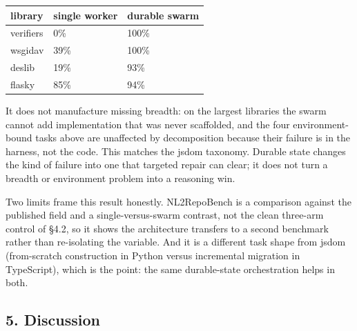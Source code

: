\documentclass[
  10pt,
]{article}
\newcounter{none} %
\begin{document}
{\def\LTcaptype{none} %
\begin{longtable}[]{@{}lll@{}}
\toprule\noalign{}
library & single worker & durable swarm \\
\midrule\noalign{}
\endhead
\bottomrule\noalign{}
\endlastfoot
verifiers & 0\% & 100\% \\
wsgidav & 39\% & 100\% \\
deslib & 19\% & 93\% \\
flasky & 85\% & 94\% \\
\end{longtable}
}

It does not manufacture missing breadth: on the largest libraries the
swarm cannot add implementation that was never scaffolded, and the four
environment-bound tasks above are unaffected by decomposition because
their failure is in the harness, not the code. This matches the jsdom
taxonomy. Durable state changes the kind of failure into one that
targeted repair can clear; it does not turn a breadth or environment
problem into a reasoning win.

Two limits frame this result honestly. NL2RepoBench is a comparison
against the published field and a single-versus-swarm contrast, not the
clean three-arm control of §4.2, so it shows the architecture transfers
to a second benchmark rather than re-isolating the variable. And it is a
different task shape from jsdom (from-scratch construction in Python
versus incremental migration in TypeScript), which is the point: the
same durable-state orchestration helps in both.

\subsection{5. Discussion}\label{discussion}
\end{document}
